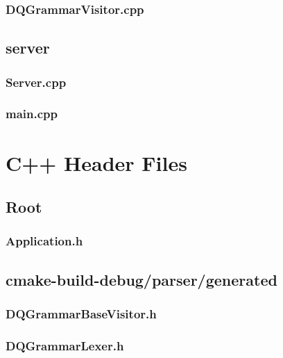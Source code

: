 \subsubsection*{DQGrammarVisitor.cpp}


\subsection*{server}

\subsubsection*{Server.cpp}


\subsubsection*{main.cpp}


\section{C++ Header Files}

\subsection*{Root}

\subsubsection*{Application.h}


\subsection*{cmake-build-debug/parser/generated}

\subsubsection*{DQGrammarBaseVisitor.h}


\subsubsection*{DQGrammarLexer.h}


